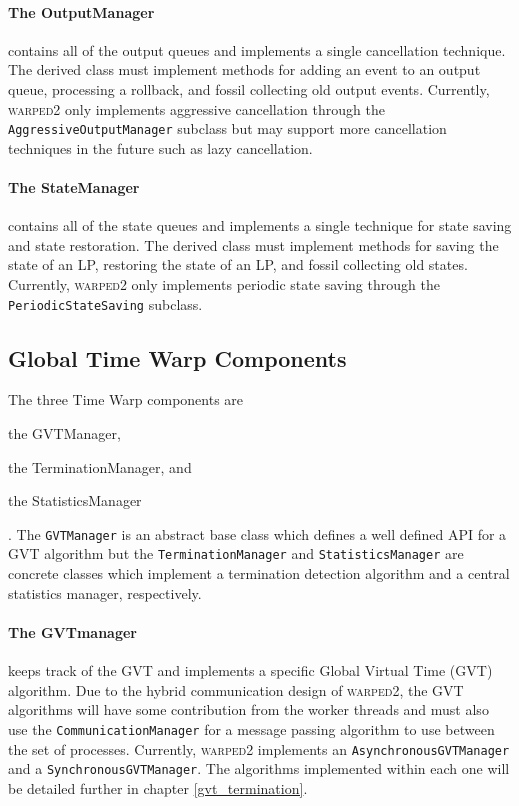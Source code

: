 \documentclass[11pt]{book}
\begin{document}
\paragraph{The OutputManager} contains all of the output queues and implements a single
cancellation technique.  The derived class must implement methods for adding an event to an output queue,
processing a rollback, and fossil collecting old output events.  Currently, \textsc{warped2} only
implements aggressive cancellation through the \texttt{AggressiveOutputManager} subclass but
may support more cancellation techniques in the future such as lazy cancellation.

\paragraph{The StateManager} contains all of the state queues and implements a single technique
for state saving and state restoration.  The derived class must implement methods for saving the
state of an LP, restoring the state of an LP, and fossil collecting old states.  Currently,
\textsc{warped2} only implements periodic state saving through the \texttt{PeriodicStateSaving}
subclass.

\subsection{Global Time Warp Components}

The three Time Warp components are \begin{inparaenum}[(1)] \item the GVTManager, \item
the TerminationManager, and \item the StatisticsManager \end{inparaenum}.  The \texttt{GVTManager}
is an abstract base class which defines a well defined API for a GVT algorithm but the
\texttt{TerminationManager} and \texttt{StatisticsManager} are concrete classes which implement
a termination detection algorithm and a central statistics manager, respectively.

\paragraph{The GVTmanager} keeps track of the GVT and implements a specific Global Virtual Time
(GVT) algorithm.  Due to the hybrid communication design of \textsc{warped2}, the GVT algorithms
will have some contribution from the worker threads and must also use the \texttt{CommunicationManager}
for a message passing algorithm to use between the set of processes.  Currently, \textsc{warped2}
implements an \texttt{AsynchronousGVTManager} and a \texttt{SynchronousGVTManager}.  The algorithms
implemented within each one will be detailed further in chapter \ref{gvt_termination}.
\end{document}
